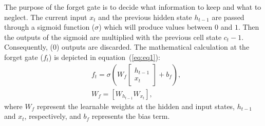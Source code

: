 The purpose of the forget gate is to decide what information to keep and what to neglect. 
The current input \(x_{t}\) and the previous hidden state  \(h_{t-1}\) are passed through a sigmoid function (\(\sigma\)) which will produce values between \(0\) and \(1\).
Then the outputs of the sigmoid are multiplied with the previous cell state \(c_t-1\). 
Consequently, (\(0\)) outputs are discarded.
The mathematical calculation at the forget gate ($f_t$) is depicted in 
equation~(\ref{eq:eq1}):
\begin{equation}
\begin{aligned}
	&f_{t}=\sigma\left( W_{f}  
	\left[
	\begin{array}{c}
		h_{t-1} \\ x_{t}
	\end{array} 
	\right]
	+ b_{f} \right), \\
	&W_{f} = \left[ W_{h_{t-1}}  W_{x_{t}} \right],
	\label{eq:eq1}
\end{aligned}
\end{equation}
where \(W_{f}\) represent the learnable weights at the hidden and input states, \(h_{t-1}\) and \(x_{t}\), respectively, and \(b_{f}\) represents the bias term. 

